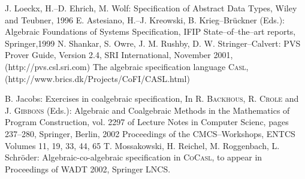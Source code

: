 \documentclass[landscape, autoslides, light]{mmiss}
\newcommand{\ns}{\normalsize}
\newcommand{\CASL}{\textmd{\textsc{Casl}}\xspace }
\newcommand{\CoCASL}{\textmd{\textsc{CoCasl}}\xspace }
\begin{document}
\begin{Package}[Label={FSDPT}, Title={Formal Specification of Data and Process Types}, ShortTitle={FSDPT}, Authors={Horst Reichel}, Date={February 2003}, LevelOfDetail=Lecture, Language=en-GB]


\begin{Section}[Title={Literature}, Label={section1}]


\begin{Paragraph}[Title={Data Types}, Label=Paragraph1]
\small
\begin{List}[ListType=itemize]
\ListItem J. Loeckx, H.--D. Ehrich, M. Wolf: Specification of
   Abstract Data Types, Wiley and Teubner, 1996
 \ListItem E. Astesiano, H.--J. Kreowski, B. Krieg--Br{\"u}ckner
       (Eds.): Algebraic Foundations of Systems Specification, IFIP
      State--of--the--art reports, Springer,1999
\ListItem   N. Shankar, S. Owre, J. M. Rushby, D. W.
Stringer--Calvert: PVS Prover Guide, Version 2.4, SRI
International, November 2001, (http://pvs.csl.sri.com)
 \ListItem The algebraic specification language \CASL,
 (http://www.brics.dk/Projects/CoFI/CASL.html)
\end{List}


\end{Paragraph}
\begin{Paragraph}[Title={Process Types}, Label=Paragraph2]
\begin{List}[ListType=itemize]
\ListItem B. Jacobs: Exercises in coalgebraic specification, In
  \textsc{R. Backhous,  R. Crole} and \textsc{J. Gibbons} (Eds.):
  Algebraic and Coalgebraic Methods in the Mathematics of
  Program Construction, vol. 2297 of Lecture Notes in
  Computer Scienc, pages 237--280, Springer, Berlin, 2002
 \ListItem Proceedings of the CMCS--Workshops, ENTCS Volumes 11, 19,
 33, 44, 65
 \ListItem T. Mossakowski, H. Reichel, M. Roggenbach, L.
 Schr\"oder: Algebraic-co-algebraic specification in \CoCASL, to
 appear in Proceedings of WADT 2002, Springer LNCS.
\end{List}
\ns


\end{Paragraph}
\end{Section}
\end{Package}
\end{document}
